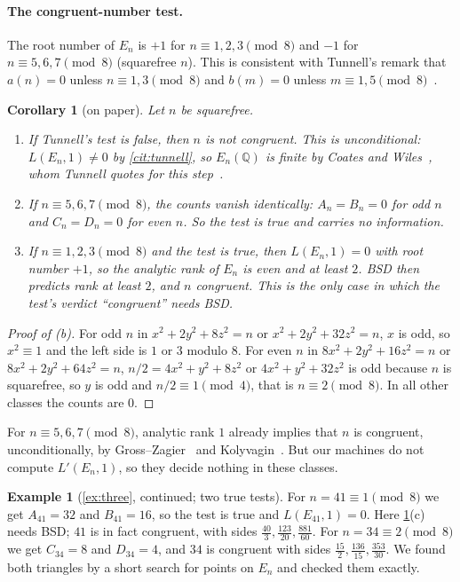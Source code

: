 \documentclass[10pt]{amsart}
\theoremstyle{plain}
\newtheorem{corollary}[theorem]{Corollary}
\theoremstyle{definition}
\newtheorem{example}[theorem]{Example}
\theoremstyle{remark}
\numberwithin{equation}{section}
\newcommand{\Q}{\mathbb{Q}}
\newcommand{\nr}{\dag}%
\begin{document}
\paragraph{The congruent-number test.} The root number of $E_n$ is $+1$ for $n\equiv1,2,3\pmod8$ and $-1$
for $n\equiv5,6,7\pmod8$ (squarefree $n$). This is consistent with Tunnell's remark that $a(n)=0$ unless
$n\equiv1,3\pmod 8$ and $b(m)=0$ unless $m\equiv1,5\pmod8$~\cite[p.~329]{Tun83}.

\begin{corollary}[on paper]\label{cor:congruent}
Let $n$ be squarefree.
\begin{enumerate}[label=(\alph*)]
\item If Tunnell's test is false, then $n$ is not congruent. This is unconditional: $L(E_n,1)\neq0$ by
\cref{cit:tunnell}, so $E_n(\Q)$ is finite by Coates and Wiles~\cite{CW77}\nr, whom Tunnell quotes for this
step~\cite[p.~329]{Tun83}.
\item If $n\equiv5,6,7\pmod8$, the counts vanish identically: $A_n=B_n=0$ for odd $n$ and $C_n=D_n=0$ for even
$n$. So the test is true and carries no information.
\item If $n\equiv1,2,3\pmod8$ and the test is true, then $L(E_n,1)=0$ with root number $+1$, so the analytic
rank of $E_n$ is even and at least $2$. BSD then predicts rank at least $2$, and $n$ congruent. This is the only
case in which the test's verdict ``congruent'' needs BSD.
\end{enumerate}
\end{corollary}

\begin{proof}[Proof of (b)]
For odd $n$ in $x^2+2y^2+8z^2=n$ or $x^2+2y^2+32z^2=n$, $x$ is odd, so $x^2\equiv1$ and the left side is $1$
or $3$ modulo $8$. For even $n$ in $8x^2+2y^2+16z^2=n$ or $8x^2+2y^2+64z^2=n$, $n/2=4x^2+y^2+8z^2$ or
$4x^2+y^2+32z^2$ is odd because $n$ is squarefree, so $y$ is odd and $n/2\equiv1\pmod4$, that is $n\equiv2\pmod8$. In all other
classes the counts are $0$.
\end{proof}

\noindent For $n\equiv5,6,7\pmod8$, analytic rank $1$ already implies that $n$ is congruent, unconditionally,
by Gross--Zagier~\cite{GZ86}\nr{} and Kolyvagin~\cite{Kol88,Kol90}\nr. But our machines do not compute
$L'(E_n,1)$, so they decide nothing in these classes.

\begin{example}[\cref{ex:three}, continued; two true tests]\label{ex:true}
For $n=41\equiv1\pmod8$ we get $A_{41}=32$ and $B_{41}=16$, so the test is true and $L(E_{41},1)=0$. Here
\cref{cor:congruent}(c) needs BSD; $41$ is in fact congruent, with sides $\frac{40}{3},\frac{123}{20},\frac{881}{60}$.
For $n=34\equiv2\pmod8$ we get $C_{34}=8$ and $D_{34}=4$, and $34$ is congruent with sides
$\frac{15}{2},\frac{136}{15},\frac{353}{30}$. We found both triangles by a short search for points on $E_n$
and checked them exactly.
\end{example}
\end{document}

